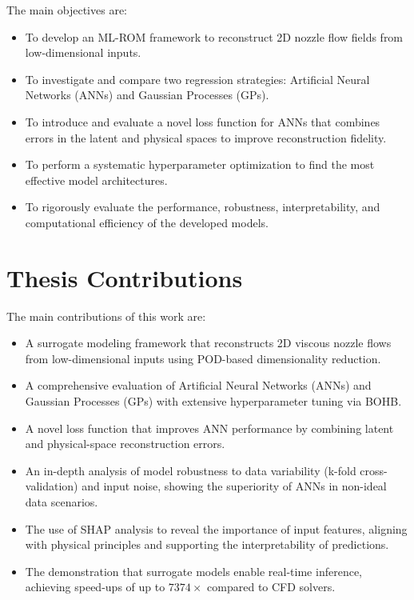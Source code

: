 \documentclass[dscexam, EN]{ufabcFHZh}
\begin{document}
The main objectives are:
\begin{itemize}
    \item To develop an ML-ROM framework to reconstruct 2D nozzle flow fields from low-dimensional inputs.
    \item To investigate and compare two regression strategies: Artificial Neural Networks (ANNs) and Gaussian Processes (GPs).
    \item To introduce and evaluate a novel loss function for ANNs that combines errors in the latent and physical spaces to improve reconstruction fidelity.
    \item To perform a systematic hyperparameter optimization to find the most effective model architectures.
    \item To rigorously evaluate the performance, robustness, interpretability, and computational efficiency of the developed models.
\end{itemize}

\section{Thesis Contributions}
The main contributions of this work are:
\begin{itemize}
    \item A surrogate modeling framework that reconstructs 2D viscous nozzle flows from low-dimensional inputs using POD-based dimensionality reduction.
    \item A comprehensive evaluation of Artificial Neural Networks (ANNs) and Gaussian Processes (GPs) with extensive hyperparameter tuning via BOHB.
    \item A novel loss function that improves ANN performance by combining latent and physical-space reconstruction errors.
    \item An in-depth analysis of model robustness to data variability (k-fold cross-validation) and input noise, showing the superiority of ANNs in non-ideal data scenarios.
    \item The use of SHAP analysis to reveal the importance of input features, aligning with physical principles and supporting the interpretability of predictions.
    \item The demonstration that surrogate models enable real-time inference, achieving speed-ups of up to $7374\times$ compared to CFD solvers.
\end{itemize}
\end{document}
